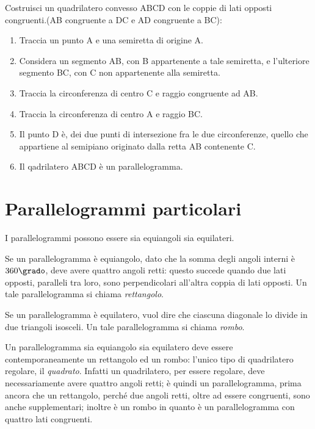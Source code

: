 \begin{procedura}
  Costruisci un quadrilatero convesso ABCD con le coppie di lati opposti 
congruenti.(AB congruente a DC e AD congruente a BC):
  \begin{enumerate} [nosep]
    \item 
    Traccia un punto A e una semiretta di origine A.
    \item 
    Considera un segmento AB, con B appartenente a tale semiretta, e 
l'ulteriore segmento BC, con C non appartenente alla semiretta.
    \item 
    Traccia la circonferenza di centro C e raggio congruente ad AB.
    \item 
    Traccia la circonferenza di centro A e raggio BC.
    
    \item
    Il punto D è, dei due punti di intersezione fra le due circonferenze, 
quello che appartiene al semipiano originato dalla retta AB contenente C.
    \item 
    Il qadrilatero ABCD è un parallelogramma.
\end{enumerate}
\end{procedura}

\section{Parallelogrammi particolari}
  \label{sect:parallelogrammi_particolari}

I parallelogrammi possono essere sia equiangoli sia equilateri.

\noindent\begin{minipage}{0.7\textwidth}\parindent15pt
  Se un parallelogramma è equiangolo, dato che la somma degli angoli 
  interni è $360\grado$, deve avere quattro angoli retti: questo 
  succede quando due lati opposti, paralleli tra loro, sono 
  perpendicolari all’altra coppia di lati opposti. Un tale 
  parallelogramma si chiama \emph{rettangolo}.
  
  Se un parallelogramma è equilatero, vuol dire che ciascuna diagonale 
  lo divide in due triangoli isosceli. Un tale parallelogramma si 
  chiama \emph{rombo}.
  
  Un parallelogramma sia equiangolo sia equilatero deve essere 
  contemporaneamente un rettangolo ed un rombo: l'unico tipo di 
  quadrilatero regolare, il \emph{quadrato}. Infatti un quadrilatero, 
  per essere regolare, deve necessariamente avere quattro angoli retti; 
  è quindi un parallelogramma, prima ancora che un rettangolo, perché 
  due angoli retti, oltre ad essere congruenti, sono anche 
  supplementari; inoltre è un rombo in quanto è un parallelogramma con 
  quattro lati congruenti.
\end{minipage}\hfil
\begin{minipage}{0.3\textwidth}
  \centering\\~\\
  \centering\\~\\
  \centering
\end{minipage}

